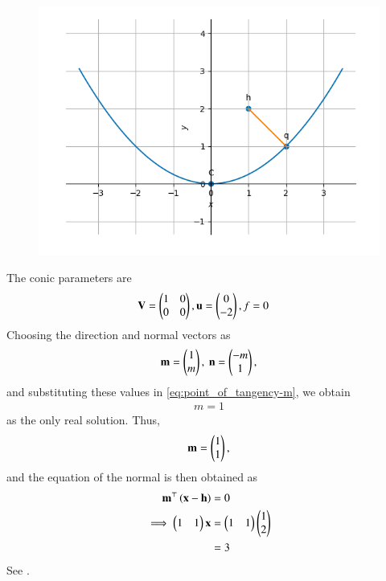 	\begin{figure}[!h]
		\centering
 \includegraphics[width=\columnwidth]{chapters/12/6/6/4/figs/conics.png}
		\caption{}
		\label{fig:12/6/6/4}
  	\end{figure}
The conic parameters are
\begin{align}
	\mathbf{V} = \begin{pmatrix}1 & 0\\0 & 0\end{pmatrix},
	\mathbf{u} = \begin{pmatrix}0\\-2\end{pmatrix},
	f &= 0
\end{align}
Choosing the direction and normal vectors as
\begin{align}
	\mathbf{m} = \begin{pmatrix}1 \\ m\end{pmatrix}, \
	\mathbf{n} = \begin{pmatrix}-m \\ 1\end{pmatrix}, 
\end{align}
and substituting these values in
	\eqref{eq:point_of_tangency-m},
 we obtain
\begin{align}
m = 1
\end{align}
as the only real solution.  Thus, 
\begin{align}
	\mathbf{m} = \begin{pmatrix}1 \\ 1\end{pmatrix}, 
\end{align}
and 
	the equation of the normal is then obtained as
\begin{align}
	\mathbf{m}^{\top}\left(\mathbf{x}-\mathbf{h}\right) &= 0
	\\
	\implies
\begin{pmatrix}
1 & 1
\end{pmatrix}
		\mathbf{x}
	&=
\begin{pmatrix}
1 & 1
\end{pmatrix}
	\begin{pmatrix}1 \\2 \end{pmatrix}
	\\
	&= 3
\end{align}
		See .
